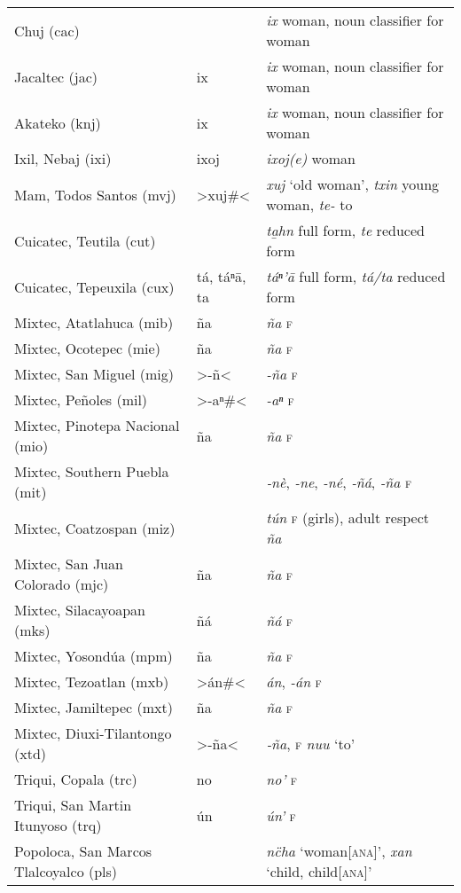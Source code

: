 {\begin{longtable}{L{.25\textwidth}L{.25\textwidth}L{.5\textwidth}}
Chuj (cac)	&		&	\textit{\textquotesingle{}ix} woman, noun classifier for woman	\\
Jacaltec (jac)	&	ix	&	\textit{ix} woman, noun classifier for woman	\\
Akateko (knj)	&	ix	&	\textit{ix} woman, noun classifier for woman	\\
Ixil, Nebaj (ixi)	&	ixoj	&	\textit{ixoj(e)} woman	\\
Mam, Todos Santos (mvj)	&	>xuj\#<	&	\textit{xuj} ‘old woman’, \textit{txin} young woman, \textit{te-} to	\\
Cuicatec, Teutila (cut)	&		&	\textit{ta̱hn} full form, \textit{te} reduced form	\\
Cuicatec, Tepeuxila (cux)	&	tá, táⁿ\textquotesingle{}ā, ta	&	\textit{táⁿ’ā} full form, \textit{tá/ta} reduced form	\\
Mixtec, Atatlahuca (mib)	&	ña	&	\textit{ña} \textsc{f}	\\
Mixtec, Ocotepec (mie)	&	ña	&	\textit{ña} \textsc{f}	\\
Mixtec, San Miguel (mig)	&	>-ñ<	&	\textit{-ña} \textsc{f}	\\
Mixtec, Peñoles (mil)	&	>-aⁿ\#<	&	\textit{-aⁿ} \textsc{f}	\\
Mixtec, Pinotepa Nacional (mio)	&	ña	&	\textit{ña} \textsc{f}	\\
Mixtec, Southern Puebla (mit)	&		&	\textit{‑nè}, \textit{-ne}, \textit{-né}, \textit{‑ñá}, \textit{-ña} \textsc{f}	\\
Mixtec, Coatzospan (miz)	&		&	\textit{tún} \textsc{f} (girls), adult respect \textit{ña}	\\
Mixtec, San Juan Colorado (mjc)	&	ña	&	\textit{ña} \textsc{f}	\\
Mixtec, Silacayoapan (mks)	&	ñá	&	\textit{ñá} \textsc{f}	\\
Mixtec, Yosondúa (mpm)	&	ña	&	\textit{ña} \textsc{f}	\\
Mixtec, Tezoatlan (mxb)	&	>án\#<	&	\textit{án}, \textit{-án} \textsc{f}	\\
Mixtec, Jamiltepec (mxt)	&	ña	&	\textit{ña} \textsc{f}	\\
Mixtec, Diuxi-Tilantongo (xtd)	&	>-ña<	&	\textit{‑ña}, \textsc{f} \textit{nuu} ‘to’	\\
Triqui, Copala (trc)	&	no\textquotesingle{}	&	\textit{no’} \textsc{f}	\\
Triqui, San Martin Itunyoso (trq)	&	ún\textquotesingle{}	&	\textit{ún’} \textsc{f}	\\
Popoloca, San Marcos Tlalcoyalco (pls)	&		&	\textit{nc̈ha} ‘woman[\textsc{ana}]’, \textit{xan} ‘child, child[\textsc{ana}]’	\\

\end{longtable}}
